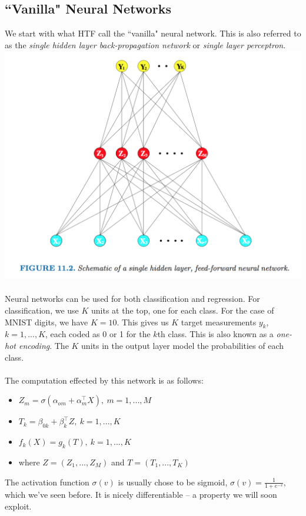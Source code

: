 \documentclass[a4paper]{article}
\begin{document}
\subsection{``Vanilla" Neural Networks}
We start with what HTF call the ``vanilla" neural network. This is also referred to as the \emph{single hidden layer back-propagation network} or \emph{single layer perceptron}.
\includegraphics[width=\textwidth]{VanillaNN.png}
\\\\
Neural networks can be used for both classification and regression. For classification, we use ${K}$ units at the top, one for each class. For the case of MNIST digits, we have ${K=10}$. This gives us ${K}$ target measurements ${y_k}$, ${k=1,...,K}$, each coded as 0 or 1 for the ${k}$th class. This is also known as a \emph{one-hot encoding}. The $K$ units in the output layer model the probabilities of each class. \\\\
The computation effected by this network is as follows:
\begin{itemize}
  \item $Z_m=\sigma(\alpha_{om}+\alpha_m^\top X),\ m=1,...,M$
  \item $T_k=\beta_{0k} + {\beta_k^\top Z},\ k=1,...,K$
  \item $f_k(X) = g_k(T),\ k=1,...,K$
  \item where $Z = (Z_1, ...,Z_M)$ and $T = (T_1,...,T_K)$
\end{itemize}
The activation function $\sigma(v)$ is usually chose to be sigmoid, $\sigma(v) = \frac{1}{1+e^{-v}}$, which we've seen before. It is nicely differentiable -- a property we will soon exploit.
\end{document}
